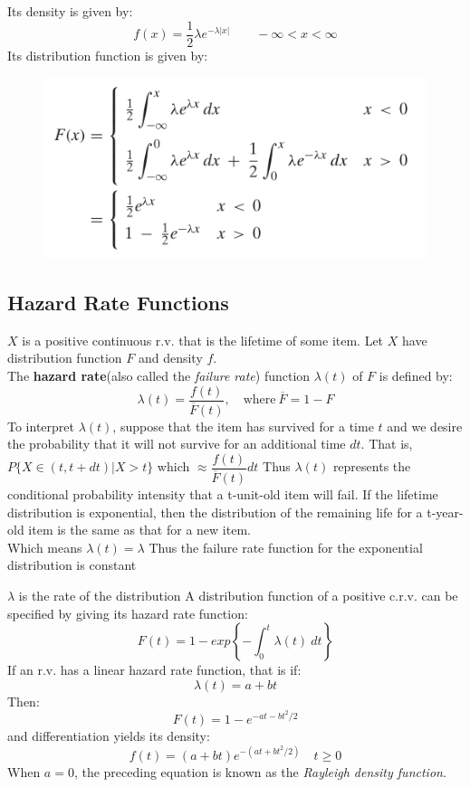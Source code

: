 \documentclass[openany]{book}
\numberwithin{equation}{section}
\begin{document}
\begin{flushleft}
Its density is given by:
\[f(x)=\frac{1}{2}\lambda e^{-\lambda|x|} \qquad -\infty<x<\infty
\]
Its distribution function is given by:
\begin{figure}[H]
\includegraphics[scale=.7]{laplace.png}
\end{figure}
\subsection{Hazard Rate Functions}
$X$ is a positive continuous r.v. that is the lifetime of some item. Let $X$ have distribution function $F$ and density $f$.\\
The \textbf{hazard rate}(also called the \textit{failure rate}) function $\lambda(t)$ of $F$ is defined by:
\[\lambda(t)=\frac{f(t)}{\overline{F}(t)}, \quad \text{where} \ \overline{F}=1-F
\]
To interpret $\lambda(t)$, suppose that the item has survived for a time $t$ and we desire the probability that it will not survive for an additional time $dt$. That is, $P\{X \in (t, t+dt)|X>t\}$\medbreak
which  $\approx \dfrac{f(t)}{\overline{F}(t)}dt$\medbreak
Thus $\lambda(t)$ represents the conditional probability intensity that a t-unit-old item will fail.\medbreak
If the lifetime distribution is exponential, then the distribution of the remaining life for a t-year-old item is the same as that for a new item. \\
Which means $\lambda(t)=\lambda$ \medbreak
Thus the failure rate function for the exponential distribution is constant \medbreak

$\lambda$ is the rate of the distribution \medbreak
A distribution function of a positive c.r.v. can be specified by giving its hazard rate function:
\begin{equation}
\label{5.5.4}
F(t)=1-exp\left\{ -\int_{0}^{t} \lambda(t) \ dt \right\}
\end{equation}
\pagebreak
\medbreak
If an r.v. has a linear hazard rate function, that is if:\\
\[\lambda(t)=a+bt\]
Then:
\[F(t)=1-e^{-at-bt^2/2}\]
and differentiation yields its density:
\[f(t)=(a+bt)e^{-(at+bt^2/2)} \quad t\geq 0
\]
When $a=0$, the preceding equation is known as the \textit{Rayleigh density function}.

\end{flushleft}
\end{document}
